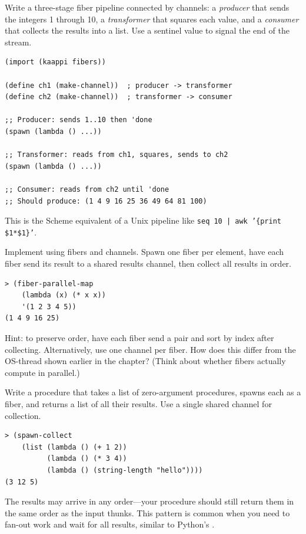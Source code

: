 \begin{exercise}
Write a three-stage fiber pipeline connected by channels: a \emph{producer} that sends the integers 1 through 10, a \emph{transformer} that squares each value, and a \emph{consumer} that collects the results into a list. Use a sentinel value  to signal the end of the stream.

\begin{lstlisting}
(import (kaappi fibers))

(define ch1 (make-channel))  ; producer -> transformer
(define ch2 (make-channel))  ; transformer -> consumer

;; Producer: sends 1..10 then 'done
(spawn (lambda () ...))

;; Transformer: reads from ch1, squares, sends to ch2
(spawn (lambda () ...))

;; Consumer: reads from ch2 until 'done
;; Should produce: (1 4 9 16 25 36 49 64 81 100)
\end{lstlisting}

This is the Scheme equivalent of a Unix pipeline like \texttt{seq 10 | awk '\{print \$1*\$1\}'}.
\end{exercise}

\begin{exercise}
Implement  using fibers and channels. Spawn one fiber per element, have each fiber send its result to a shared results channel, then collect all results in order.

\begin{lstlisting}[style=repl]
> (fiber-parallel-map
    (lambda (x) (* x x))
    '(1 2 3 4 5))
(1 4 9 16 25)
\end{lstlisting}

Hint: to preserve order, have each fiber send a pair  and sort by index after collecting. Alternatively, use one channel per fiber. How does this differ from the OS-thread  shown earlier in the chapter? (Think about whether fibers actually compute in parallel.)
\end{exercise}

\begin{exercise}
Write a procedure  that takes a list of zero-argument procedures, spawns each as a fiber, and returns a list of all their results. Use a single shared channel for collection.

\begin{lstlisting}[style=repl]
> (spawn-collect
    (list (lambda () (+ 1 2))
          (lambda () (* 3 4))
          (lambda () (string-length "hello"))))
(3 12 5)
\end{lstlisting}

The results may arrive in any order---your procedure should still return them in the same order as the input thunks. This pattern is common when you need to fan-out work and wait for all results, similar to Python's .
\end{exercise}

